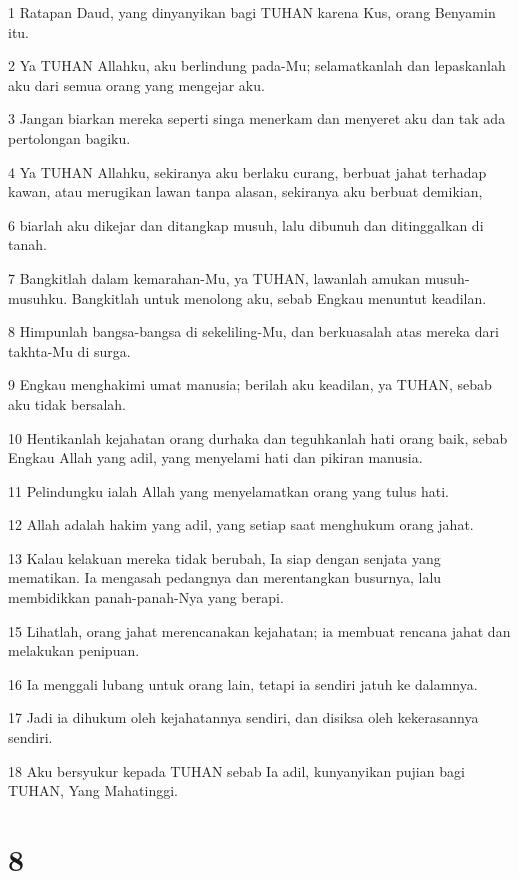 \par 1 Ratapan Daud, yang dinyanyikan bagi TUHAN karena Kus, orang Benyamin itu.
\par 2 Ya TUHAN Allahku, aku berlindung pada-Mu; selamatkanlah dan lepaskanlah aku dari semua orang yang mengejar aku.
\par 3 Jangan biarkan mereka seperti singa menerkam dan menyeret aku dan tak ada pertolongan bagiku.
\par 4 Ya TUHAN Allahku, sekiranya aku berlaku curang, berbuat jahat terhadap kawan, atau merugikan lawan tanpa alasan, sekiranya aku berbuat demikian,
\par 6 biarlah aku dikejar dan ditangkap musuh, lalu dibunuh dan ditinggalkan di tanah.
\par 7 Bangkitlah dalam kemarahan-Mu, ya TUHAN, lawanlah amukan musuh-musuhku. Bangkitlah untuk menolong aku, sebab Engkau menuntut keadilan.
\par 8 Himpunlah bangsa-bangsa di sekeliling-Mu, dan berkuasalah atas mereka dari takhta-Mu di surga.
\par 9 Engkau menghakimi umat manusia; berilah aku keadilan, ya TUHAN, sebab aku tidak bersalah.
\par 10 Hentikanlah kejahatan orang durhaka dan teguhkanlah hati orang baik, sebab Engkau Allah yang adil, yang menyelami hati dan pikiran manusia.
\par 11 Pelindungku ialah Allah yang menyelamatkan orang yang tulus hati.
\par 12 Allah adalah hakim yang adil, yang setiap saat menghukum orang jahat.
\par 13 Kalau kelakuan mereka tidak berubah, Ia siap dengan senjata yang mematikan. Ia mengasah pedangnya dan merentangkan busurnya, lalu membidikkan panah-panah-Nya yang berapi.
\par 15 Lihatlah, orang jahat merencanakan kejahatan; ia membuat rencana jahat dan melakukan penipuan.
\par 16 Ia menggali lubang untuk orang lain, tetapi ia sendiri jatuh ke dalamnya.
\par 17 Jadi ia dihukum oleh kejahatannya sendiri, dan disiksa oleh kekerasannya sendiri.
\par 18 Aku bersyukur kepada TUHAN sebab Ia adil, kunyanyikan pujian bagi TUHAN, Yang Mahatinggi.

\chapter{8}


